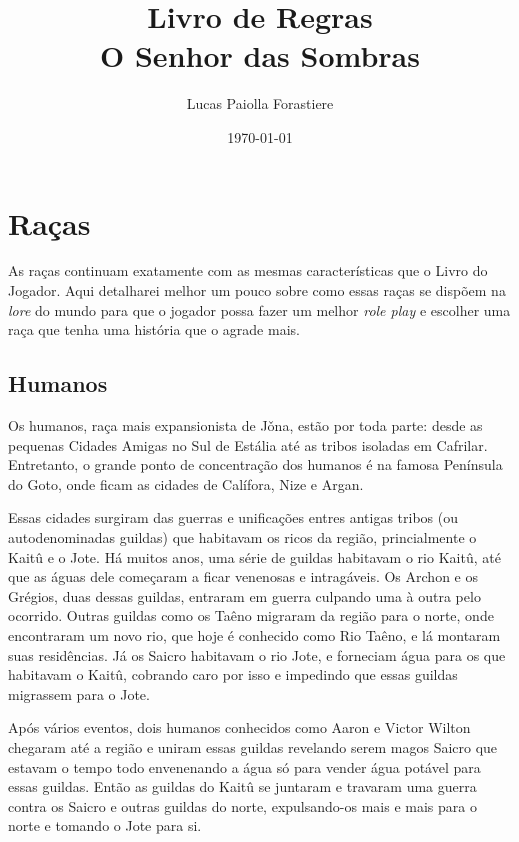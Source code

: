 \documentclass{RPG_Adventure}[2021/10/20]
\title{Livro de Regras\\ \Huge{O Senhor das Sombras}}
\date{\today}
\author{Lucas Paiolla Forastiere}
\begin{document}
\maketitle
\tableofcontents
\newpage


\chapter{Raças}%
\label{cha:racas}
\begin{multicols}{2}

As raças continuam exatamente com as mesmas características que o Livro do
Jogador. Aqui detalharei melhor um pouco sobre como essas raças se dispõem na
\textit{lore} do mundo para que o jogador possa fazer um melhor \textit{role
play} e escolher uma raça que tenha uma história que o agrade mais.

\section{Humanos}%

Os humanos, raça mais expansionista de Jǒna, estão por toda parte: desde as
pequenas Cidades Amigas no Sul de Estália até as tribos isoladas em Cafrilar.
Entretanto, o grande ponto de concentração dos humanos é na famosa Península do
Goto, onde ficam as cidades de Calífora, Nize e Argan.

Essas cidades surgiram das guerras e unificações entres antigas tribos (ou
autodenominadas guildas) que habitavam os ricos da região, princialmente o
Kaitû e o Jote. Há muitos anos, uma série de guildas habitavam o rio Kaitû, até
que as águas dele começaram a ficar venenosas e intragáveis. Os Archon e os
Grégios, duas dessas guildas, entraram em guerra culpando uma à outra pelo
ocorrido. Outras guildas como os Taêno migraram da região para o norte, onde
encontraram um novo rio, que hoje é conhecido como Rio Taêno, e lá montaram suas
residências. Já os Saicro habitavam o rio Jote, e forneciam água para os que
habitavam o Kaitû, cobrando caro por isso e impedindo que essas guildas
migrassem para o Jote.

Após vários eventos, dois humanos conhecidos como Aaron e Victor Wilton chegaram
até a região e uniram essas guildas revelando serem magos Saicro que estavam o
tempo todo envenenando a água só para vender água potável para essas guildas.
Então as guildas do Kaitû se juntaram e travaram uma guerra contra os Saicro e
outras guildas do norte, expulsando-os mais e mais para o norte e tomando o Jote
para si.


\end{multicols}
\end{document}
